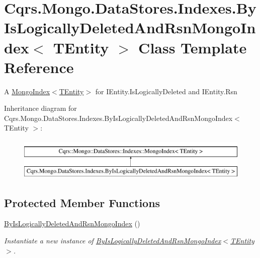 \hypertarget{classCqrs_1_1Mongo_1_1DataStores_1_1Indexes_1_1ByIsLogicallyDeletedAndRsnMongoIndex}{}\section{Cqrs.\+Mongo.\+Data\+Stores.\+Indexes.\+By\+Is\+Logically\+Deleted\+And\+Rsn\+Mongo\+Index$<$ T\+Entity $>$ Class Template Reference}
\label{classCqrs_1_1Mongo_1_1DataStores_1_1Indexes_1_1ByIsLogicallyDeletedAndRsnMongoIndex}


A \hyperlink{classCqrs_1_1Mongo_1_1DataStores_1_1Indexes_1_1MongoIndex_a7affbb063520cd8c8bda27f8478efd06_a7affbb063520cd8c8bda27f8478efd06}{Mongo\+Index$<$\+T\+Entity$>$} for I\+Entity.\+Is\+Logically\+Deleted and I\+Entity.\+Rsn  


Inheritance diagram for Cqrs.\+Mongo.\+Data\+Stores.\+Indexes.\+By\+Is\+Logically\+Deleted\+And\+Rsn\+Mongo\+Index$<$ T\+Entity $>$\+:\begin{figure}[H]
\begin{center}
\leavevmode
\includegraphics[height=2.000000cm]{classCqrs_1_1Mongo_1_1DataStores_1_1Indexes_1_1ByIsLogicallyDeletedAndRsnMongoIndex}
\end{center}
\end{figure}
\subsection*{Protected Member Functions}
\begin{DoxyCompactItemize}
\item 
\hyperlink{classCqrs_1_1Mongo_1_1DataStores_1_1Indexes_1_1ByIsLogicallyDeletedAndRsnMongoIndex_a41c3a6c01a59bba485893fab8518df09_a41c3a6c01a59bba485893fab8518df09}{By\+Is\+Logically\+Deleted\+And\+Rsn\+Mongo\+Index} ()
\begin{DoxyCompactList}\small\item\em Instantiate a new instance of \hyperlink{classCqrs_1_1Mongo_1_1DataStores_1_1Indexes_1_1ByIsLogicallyDeletedAndRsnMongoIndex_a41c3a6c01a59bba485893fab8518df09_a41c3a6c01a59bba485893fab8518df09}{By\+Is\+Logically\+Deleted\+And\+Rsn\+Mongo\+Index$<$\+T\+Entity$>$}. \end{DoxyCompactList}\end{DoxyCompactItemize}
